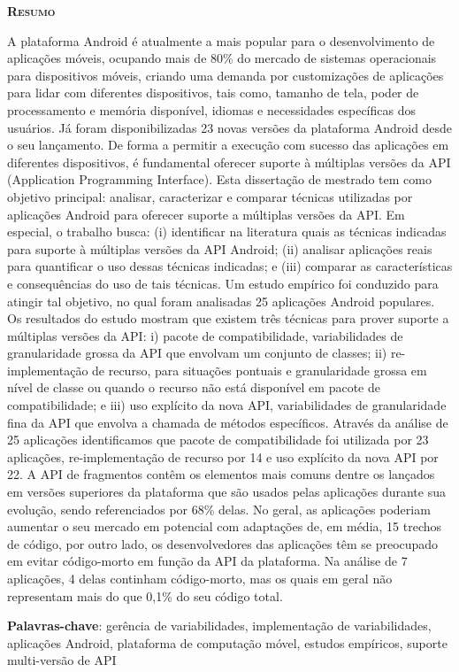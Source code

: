
\begin{center}
	\Large{\textsc{\textbf{Resumo}}}
\end{center}

\noindent A plataforma Android é atualmente a mais popular para o desenvolvimento
de aplicações móveis, ocupando mais de 80\% do mercado de sistemas operacionais para
dispositivos móveis, criando uma demanda por customizações de aplicações para lidar
com diferentes dispositivos, tais como, tamanho de tela, poder de processamento e
memória disponível, idiomas e necessidades específicas dos usuários. Já foram
disponibilizadas 23 novas versões da plataforma Android desde o seu lançamento. De
forma a permitir a execução com sucesso das aplicações em diferentes dispositivos,
é fundamental oferecer suporte à múltiplas versões da API (Application Programming
Interface). Esta dissertação de mestrado tem como objetivo principal: analisar,
caracterizar e comparar técnicas utilizadas por aplicações Android para oferecer
suporte a múltiplas versões da API. Em especial, o trabalho busca: (i) identificar
na literatura quais as técnicas indicadas para suporte à múltiplas versões da API
Android; (ii) analisar aplicações reais para quantificar o uso dessas técnicas
indicadas; e (iii) comparar as características e consequências do uso de tais
técnicas. Um estudo empírico foi conduzido para atingir tal objetivo, no qual
foram analisadas 25 aplicações Android populares. Os resultados do estudo mostram
que existem três técnicas para prover suporte a múltiplas versões da API: i) pacote
de compatibilidade, variabilidades de granularidade grossa da API que envolvam um
conjunto de classes; ii) re-implementação de recurso, para situações pontuais e
granularidade grossa em nível de classe ou quando o recurso não está disponível
em pacote de compatibilidade; e iii) uso explícito da nova API, variabilidades de
granularidade fina da API que envolva a chamada de métodos específicos. Através da
análise de 25 aplicações identificamos que pacote de compatibilidade foi utilizada
por 23 aplicações, re-implementação de recurso por 14 e uso explícito da nova API
por 22. A API de fragmentos contêm os elementos mais comuns dentre os lançados em
versões superiores da plataforma que são usados pelas aplicações durante sua evolução,
sendo referenciados por 68\% delas. No geral, as aplicações poderiam aumentar o seu
mercado em potencial com adaptações de, em média, 15 trechos de código, por outro
lado, os desenvolvedores das aplicações têm se preocupado em evitar código-morto em
função da API da plataforma. Na análise de 7 aplicações, 4 delas continham código-morto,
mas os quais em geral não representam mais do que 0,1\% do seu código total.

\noindent\textbf{Palavras-chave}: gerência de variabilidades, implementação de
variabilidades, aplicações Android, plataforma de computação móvel, estudos empíricos,
suporte multi-versão de API
